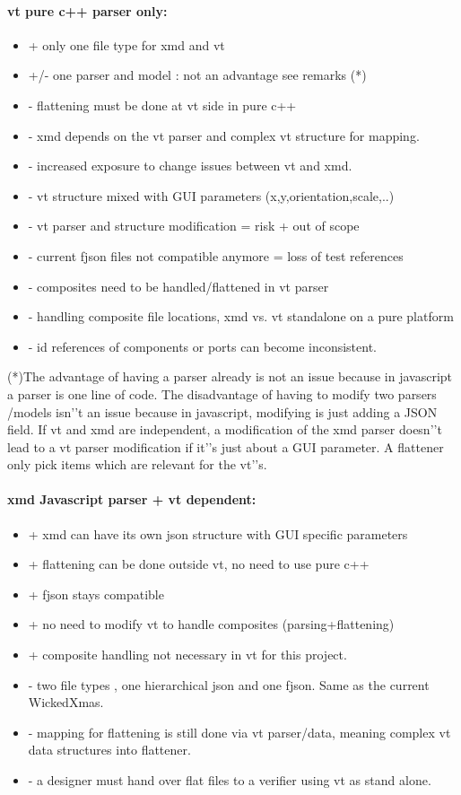 \documentclass[a4paper,11pt,final]{article}
\begin{document}
\paragraph{vt pure c++ parser only:}
\begin{itemize}
\item + only one file type for xmd and vt
\item +/- one parser and model : not an advantage see remarks (*)
\item - flattening must be done at vt side in pure c++
\item - xmd depends on the vt parser and complex vt structure for mapping.
\item - increased exposure to change issues between vt and xmd.
\item - vt structure mixed with GUI parameters (x,y,orientation,scale,..)
\item - vt parser and structure modification = risk + out of scope
\item - current fjson files not compatible anymore = loss of test references
\item - composites need to be handled/flattened in vt parser
\item - handling composite file locations, xmd vs. vt standalone on a pure platform
\item - id references of components or ports can become inconsistent.
\end{itemize}

(*)The advantage of having a parser already is not an issue because in
javascript a parser is one line of code.
The disadvantage of having to modify two parsers /models isn'’t an issue
because in javascript, modifying is just adding a JSON field.
If vt and xmd are independent, a modification of the xmd parser doesn'’t lead to
a vt parser modification if it'’s just about a GUI parameter. A flattener only pick
items which are relevant for the vt'’s.

\paragraph{xmd Javascript parser + vt dependent:}
\begin{itemize}
\item + xmd can have its own json structure with GUI specific parameters
\item + flattening can be done outside vt, no need to use pure c++
\item + fjson stays compatible
\item + no need to modify vt to handle composites (parsing+flattening)
\item + composite handling not necessary in vt for this project.
\item - two file types , one hierarchical json and one fjson. Same as the current WickedXmas.
\item - mapping for flattening is still done via vt parser/data, meaning complex vt data structures into flattener.
\item - a designer must hand over flat files to a verifier using vt as stand alone. 
\end{itemize}
\end{document}
